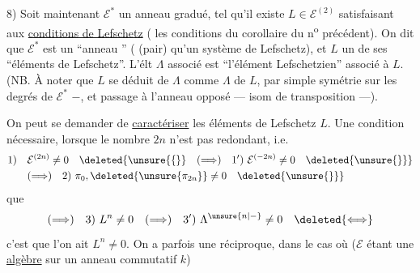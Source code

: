 8) Soit maintenant $\mathcal E^*$ un anneau gradué,  tel qu'il existe $L\in\mathcal E^{(2)}$ satisfaisant aux \uline{conditions de Lefschetz} ( les conditions du corollaire du n\textsuperscript{o} précédent). On dit que $\mathcal E^*$ est un ``anneau '' (    (pair) qu'un système de Lefschetz), et $L$ un de ses ``éléments de Lefschetz''.
L'élt $\Lambda$ associé est  ``l'élément  Lefschetzien'' associé à $L$.
(NB. À noter que $L$ se déduit de $\Lambda$ comme $\Lambda$ de $L$, par simple symétrie sur les degrés de $\mathcal E^*$  $-$, et passage à l'anneau opposé ---  isom de transposition ---).

On peut se demander de \uline{caractériser} les  éléments de Lefschetz $L$. Une condition nécessaire, lorsque le nombre $2n$ n'est pas redondant, i.e.
\[
\begin{aligned}
1)\quad&\mathcal E^{(2n)}\neq0\quad\deleted{\unsure{\{}}\quad(\Longrightarrow)\quad1')\ \mathcal E^{(-2n)}\neq0\quad\deleted{\unsure{\}}}\\
&(\Longrightarrow)\quad2)\ \pi_0,\deleted{\unsure{\pi_{2n}}}\neq0\quad\deleted{\unsure{\}}}
\end{aligned}
\]
que
\[
(\Longrightarrow)\quad3)\ L^n\neq0\quad(\Longrightarrow)\quad3')\ \Lambda^{\unsure{n|-}}\neq0\quad\deleted{\Longleftrightarrow}
\]
c'est que l'on ait $L^n\neq0$. On a parfois une réciproque, dans le cas où ($\mathcal E$ étant une \uline{algèbre} sur un anneau commutatif $k$)

